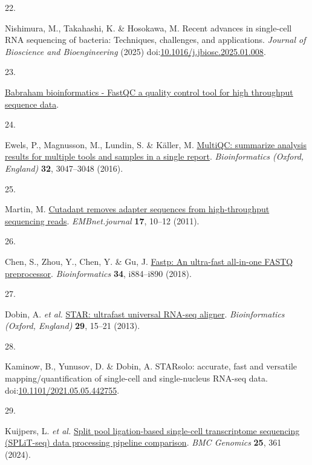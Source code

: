 \documentclass[
  11pt,
  a4paper,
]{report}
\newlength{\cslhangindent}
\newlength{\csllabelwidth}
\newenvironment{CSLReferences}[2] %
 {\begin{list}{}{%
  \setlength{\itemindent}{0pt}
  \setlength{\leftmargin}{0pt}
  \setlength{\parsep}{0pt}
  \ifodd #1
   \setlength{\leftmargin}{\cslhangindent}
   \setlength{\itemindent}{-1\cslhangindent}
  \fi
  \setlength{\itemsep}{#2\baselineskip}}}
 {\end{list}}
\newcommand{\CSLLeftMargin}[1]{\parbox[t]{\csllabelwidth}{\strut#1\strut}}
\newcommand{\CSLRightInline}[1]{\parbox[t]{\linewidth - \csllabelwidth}{\strut#1\strut}}
\begin{document}
\begin{CSLReferences}{0}{0}
\CSLLeftMargin{22. }%
\CSLRightInline{Nishimura, M., Takahashi, K. \& Hosokawa, M. Recent
advances in single-cell RNA sequencing of bacteria: Techniques,
challenges, and applications. \emph{Journal of Bioscience and
Bioengineering} (2025)
doi:\href{https://doi.org/10.1016/j.jbiosc.2025.01.008}{10.1016/j.jbiosc.2025.01.008}.}

\CSLLeftMargin{23. }%
\CSLRightInline{\href{https://www.bioinformatics.babraham.ac.uk/projects/fastqc/}{Babraham
bioinformatics - FastQC a quality control tool for high throughput
sequence data}.}

\CSLLeftMargin{24. }%
\CSLRightInline{Ewels, P., Magnusson, M., Lundin, S. \& Käller, M.
\href{https://doi.org/10.1093/bioinformatics/btw354}{MultiQC: summarize
analysis results for multiple tools and samples in a single report}.
\emph{Bioinformatics (Oxford, England)} \textbf{32}, 3047--3048 (2016).}

\CSLLeftMargin{25. }%
\CSLRightInline{Martin, M.
\href{https://doi.org/10.14806/ej.17.1.200}{Cutadapt removes adapter
sequences from high-throughput sequencing reads}. \emph{EMBnet.journal}
\textbf{17}, 10--12 (2011).}

\CSLLeftMargin{26. }%
\CSLRightInline{Chen, S., Zhou, Y., Chen, Y. \& Gu, J.
\href{https://doi.org/10.1093/bioinformatics/bty560}{Fastp: An
ultra-fast all-in-one FASTQ preprocessor}. \emph{Bioinformatics}
\textbf{34}, i884--i890 (2018).}

\CSLLeftMargin{27. }%
\CSLRightInline{Dobin, A. \emph{et al.}
\href{https://doi.org/10.1093/bioinformatics/bts635}{STAR: ultrafast
universal RNA-seq aligner}. \emph{Bioinformatics (Oxford, England)}
\textbf{29}, 15--21 (2013).}

\CSLLeftMargin{28. }%
\CSLRightInline{Kaminow, B., Yunusov, D. \& Dobin, A. STARsolo:
accurate, fast and versatile mapping/quantification of single-cell and
single-nucleus RNA-seq data.
doi:\href{https://doi.org/10.1101/2021.05.05.442755}{10.1101/2021.05.05.442755}.}

\CSLLeftMargin{29. }%
\CSLRightInline{Kuijpers, L. \emph{et al.}
\href{https://doi.org/10.1186/s12864-024-10285-3}{Split pool
ligation-based single-cell transcriptome sequencing (SPLiT-seq) data
processing pipeline comparison}. \emph{BMC Genomics} \textbf{25}, 361
(2024).}


\end{CSLReferences}
\end{document}
